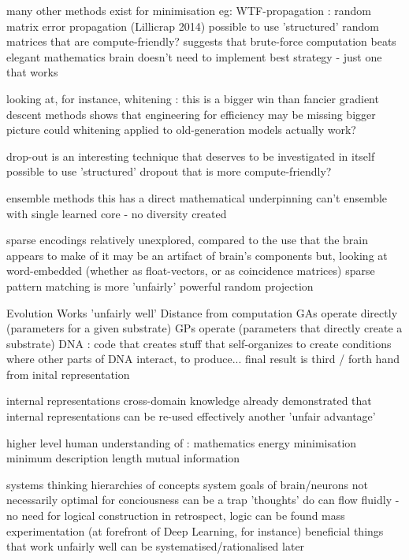 \documentclass{llncs}
\begin{document}
  many other methods exist for minimisation
    eg: WTF-propagation : random matrix error propagation (Lillicrap 2014)
      possible to use 'structured' random matrices that are compute-friendly?
      suggests that brute-force computation beats elegant mathematics
        brain doesn't need to implement best strategy - just one that works
      
  looking at, for instance, whitening : this is a bigger win than fancier gradient descent methods
    shows that engineering for efficiency may be missing bigger picture
    could whitening applied to old-generation models actually work?
  
drop-out is an interesting technique that deserves to be investigated in itself
  possible to use 'structured' dropout that is more compute-friendly?
  
ensemble methods
  this has a direct mathematical underpinning
  can't ensemble with single learned core - no diversity created
  
sparse encodings
  relatively unexplored, compared to the use that the brain appears to make of it
    may be an artifact of brain's components
    but, looking at word-embedded (whether as float-vectors, or as coincidence matrices)
      sparse pattern matching is more 'unfairly' powerful 
      random projection

Evolution
  Works 'unfairly well'
  Distance from computation
    GAs operate directly (parameters for a given substrate)
    GPs operate (parameters that directly create a substrate)
    DNA : code that creates stuff that self-organizes to create conditions where 
      other parts of DNA interact, to produce...   
        final result is third / forth hand from inital representation

internal representations
  cross-domain knowledge
    already demonstrated that internal representations can be re-used effectively
    another 'unfair advantage'

higher level human understanding of :
  mathematics
    energy minimisation
    minimum description length
    mutual information
    
  
  systems thinking
    hierarchies of concepts
      system goals of brain/neurons not necessarily optimal for conciousness
    can be a trap 
      'thoughts' do can flow fluidly - no need for logical construction
        in retrospect, logic can be found
      mass experimentation (at forefront of Deep Learning, for instance) beneficial
        things that work unfairly well can be systematised/rationalised later
\end{document}
